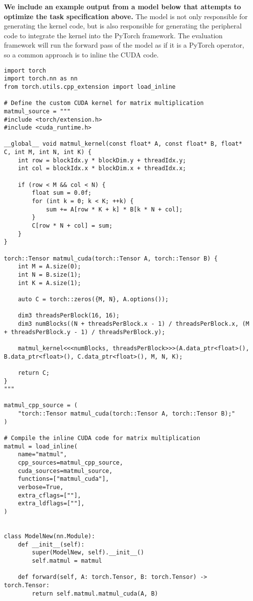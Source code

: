 \noindent \textbf{We include an example output from a model below that attempts to optimize the task specification above.} The model is not only responsible for generating the kernel code, but is also responsible for generating the peripheral code to integrate the kernel into the PyTorch framework. The evaluation framework will run the forward pass of the model as if it is a PyTorch operator, so a common approach is to inline the CUDA code. 
\clearpage
\begin{lstlisting}
import torch
import torch.nn as nn
from torch.utils.cpp_extension import load_inline

# Define the custom CUDA kernel for matrix multiplication
matmul_source = """
#include <torch/extension.h>
#include <cuda_runtime.h>

__global__ void matmul_kernel(const float* A, const float* B, float* C, int M, int N, int K) {
    int row = blockIdx.y * blockDim.y + threadIdx.y;
    int col = blockIdx.x * blockDim.x + threadIdx.x;

    if (row < M && col < N) {
        float sum = 0.0f;
        for (int k = 0; k < K; ++k) {
            sum += A[row * K + k] * B[k * N + col];
        }
        C[row * N + col] = sum;
    }
}

torch::Tensor matmul_cuda(torch::Tensor A, torch::Tensor B) {
    int M = A.size(0);
    int N = B.size(1);
    int K = A.size(1);

    auto C = torch::zeros({M, N}, A.options());

    dim3 threadsPerBlock(16, 16);
    dim3 numBlocks((N + threadsPerBlock.x - 1) / threadsPerBlock.x, (M + threadsPerBlock.y - 1) / threadsPerBlock.y);

    matmul_kernel<<<numBlocks, threadsPerBlock>>>(A.data_ptr<float>(), B.data_ptr<float>(), C.data_ptr<float>(), M, N, K);

    return C;
}
"""

matmul_cpp_source = (
    "torch::Tensor matmul_cuda(torch::Tensor A, torch::Tensor B);"
)

# Compile the inline CUDA code for matrix multiplication
matmul = load_inline(
    name="matmul",
    cpp_sources=matmul_cpp_source,
    cuda_sources=matmul_source,
    functions=["matmul_cuda"],
    verbose=True,
    extra_cflags=[""],
    extra_ldflags=[""],
)


class ModelNew(nn.Module):
    def __init__(self):
        super(ModelNew, self).__init__()
        self.matmul = matmul

    def forward(self, A: torch.Tensor, B: torch.Tensor) -> torch.Tensor:
        return self.matmul.matmul_cuda(A, B)
\end{lstlisting}